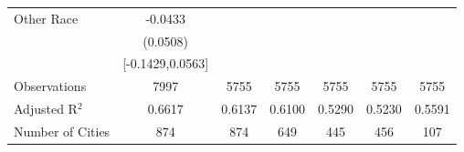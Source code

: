 \documentclass{article}
\begin{document}
\begin{table}[htbp]
\begin{tabular}{l*{6}{c}}
Other Race          &     -0.0433   &               &               &               &               &               \\
                    &    (0.0508)   &               &               &               &               &               \\
                    &[-0.1429,0.0563]   &               &               &               &               &               \\
\midrule
Observations        &        7997   &        5755   &        5755   &        5755   &        5755   &        5755   \\
Adjusted R$^2$      &      0.6617   &      0.6137   &      0.6100   &      0.5290   &      0.5230   &      0.5591   \\
Number of Cities    &         874   &         874   &         649   &         445   &         456   &         107   \\
\bottomrule
\end{tabular}
\end{table}
\end{document}
